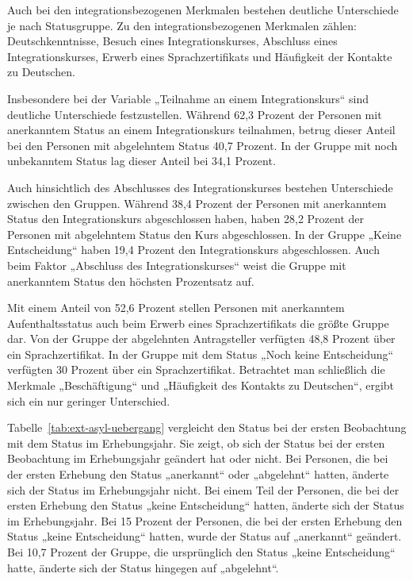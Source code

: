 Auch bei den integrationsbezogenen Merkmalen bestehen deutliche Unterschiede je nach Statusgruppe. Zu den integrationsbezogenen Merkmalen zählen: Deutschkenntnisse, Besuch eines Integrationskurses, Abschluss eines Integrationskurses, Erwerb eines Sprachzertifikats und Häufigkeit der Kontakte zu Deutschen.

Insbesondere bei der Variable „Teilnahme an einem Integrationskurs“ sind deutliche Unterschiede festzustellen. Während 62,3 Prozent der Personen mit anerkanntem Status an einem Integrationskurs teilnahmen, betrug dieser Anteil bei den Personen mit abgelehntem Status 40,7 Prozent. In der Gruppe mit noch unbekanntem Status lag dieser Anteil bei 34,1 Prozent.

Auch hinsichtlich des Abschlusses des Integrationskurses bestehen Unterschiede zwischen den Gruppen. Während 38,4 Prozent der Personen mit anerkanntem Status den Integrationskurs abgeschlossen haben, haben 28,2 Prozent der Personen mit abgelehntem Status den Kurs abgeschlossen. In der Gruppe „Keine Entscheidung“ haben 19,4 Prozent den Integrationskurs abgeschlossen. Auch beim Faktor „Abschluss des Integrationskurses“ weist die Gruppe mit anerkanntem Status den höchsten Prozentsatz auf.

Mit einem Anteil von 52,6 Prozent stellen Personen mit anerkanntem Aufenthaltsstatus auch beim Erwerb eines Sprachzertifikats die größte Gruppe dar. Von der Gruppe der abgelehnten Antragsteller verfügten 48,8 Prozent über ein Sprachzertifikat. In der Gruppe mit dem Status „Noch keine Entscheidung“ verfügten 30 Prozent über ein Sprachzertifikat. Betrachtet man schließlich die Merkmale „Beschäftigung“ und „Häufigkeit des Kontakts zu Deutschen“, ergibt sich ein nur geringer Unterschied.

Tabelle~\ref{tab:ext-asyl-uebergang} vergleicht den Status bei der ersten Beobachtung mit dem Status im Erhebungsjahr. Sie zeigt, ob sich der Status bei der ersten Beobachtung im Erhebungsjahr geändert hat oder nicht. Bei Personen, die bei der ersten Erhebung den Status „anerkannt“ oder „abgelehnt“ hatten, änderte sich der Status im Erhebungsjahr nicht. Bei einem Teil der Personen, die bei der ersten Erhebung den Status „keine Entscheidung“ hatten, änderte sich der Status im Erhebungsjahr. Bei 15 Prozent der Personen, die bei der ersten Erhebung den Status „keine Entscheidung“ hatten, wurde der Status auf „anerkannt“ geändert. Bei 10,7 Prozent der Gruppe, die ursprünglich den Status „keine Entscheidung“ hatte, änderte sich der Status hingegen auf „abgelehnt“.



